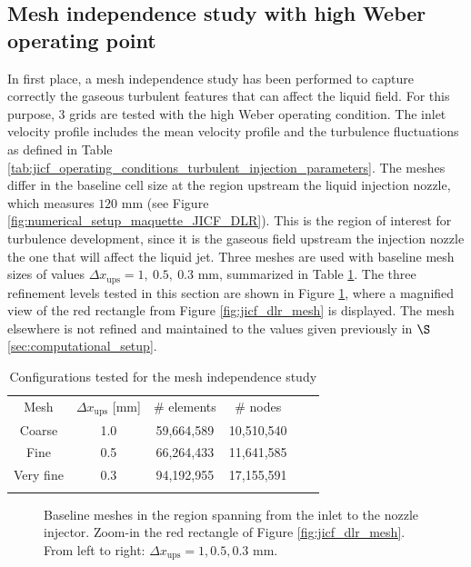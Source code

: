 \subsection{Mesh independence study with high Weber operating point}

In first place, a mesh independence study has been performed to capture correctly the gaseous turbulent features that can affect the liquid field. For this purpose, 3 grids are tested with the high Weber operating condition. The inlet velocity profile includes the mean velocity profile and the turbulence fluctuations as defined in Table \ref{tab:jicf_operating_conditions_turbulent_injection_parameters}. The meshes differ in the baseline cell size at the region upstream the liquid injection nozzle, which measures $120$ mm (see Figure \ref{fig:numerical_setup_maquette_JICF_DLR}). This is the region of interest for turbulence development, since it is the gaseous field upstream the injection nozzle the one that will affect the liquid jet. Three meshes are used with baseline mesh sizes of values $\Delta x_\mathrm{ups} = 1, ~0.5, ~0.3$ mm, summarized in Table \ref{tab:jicf_mesh_independence_gaseous_study}. The three refinement levels tested in this section are shown in Figure \ref{fig:ics_mesh_independency_study_up_meshes}, where a magnified view of the red rectangle from Figure \ref{fig:jicf_dlr_mesh} is displayed. The mesh elsewhere is not refined and maintained to the values given previously in $\S$\ref{sec:computational_setup}. %

\begin{table}[!h]
\centering
\caption{Configurations tested for the mesh independence study}
\begin{tabular}{cccccc}
\thickhline
Mesh & $\Delta x_\mathrm{ups}$ [mm] &  $\#$ elements & $\#$ nodes \\ %
\thickhline
Coarse & 1.0 & 59,664,589 & 10,510,540 \\
Fine & 0.5 & 66,264,433 & 11,641,585 \\
Very fine & 0.3 & 94,192,955 & 17,155,591 \\
\thickhline
\end{tabular}
\label{tab:jicf_mesh_independence_gaseous_study}
\end{table}

\begin{figure}[ht]
\centering
{}
\caption[Baseline meshes in the region spanning from the inlet to the nozzle injector]{Baseline meshes in the region spanning from the inlet to the nozzle injector. Zoom-in the red rectangle of Figure \ref{fig:jicf_dlr_mesh}. From left to right: $\Delta x_\mathrm{ups} = 1, 0.5, 0.3$ mm.}
\label{fig:ics_mesh_independency_study_up_meshes}
\end{figure}


